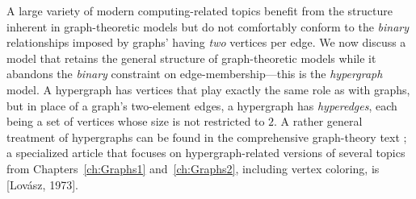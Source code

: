 \bigskip

\noindent
A large variety of modern computing-related topics benefit from the structure inherent in graph-theoretic models but do not comfortably conform to the {\em binary} relationships imposed by graphs' having {\em two} vertices per edge.  We now discuss a model that retains the general structure of graph-theoretic models while it abandons the {\em binary} constraint on edge-membership---this is the {\em hypergraph} model.  A hypergraph has vertices that play exactly the same role as with graphs, but in place of a graph's two-element edges, a hypergraph has {\em hyperedges}, each being a set of vertices whose size is not restricted to $2$.  A rather general treatment of hypergraphs can be found in the comprehensive graph-theory text \cite{Berge73}; a specialized article that focuses on hypergraph-related versions of several topics from Chapters~\ref{ch:Graphs1} and~\ref{ch:Graphs2}, including vertex coloring, is [Lov\'{a}sz, 1973].

\smallskip

